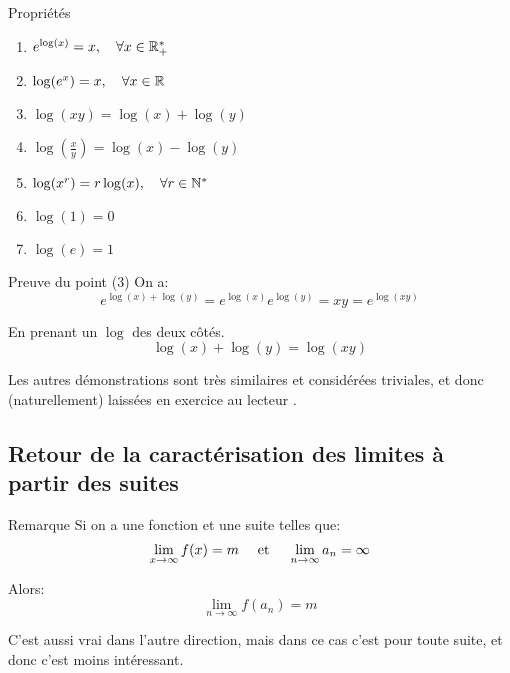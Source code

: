 \documentclass[a4paper]{article}
\begin{document}
\begin{parag}{Propriétés}
    \begin{enumerate}[left=0pt]
        \item $e^{\log\left(x\right)} = x, \mathspace \forall x \in \mathbb{R}^*_+$
        \item $\log\left(e^x\right) = x, \mathspace \forall x \in \mathbb{R}$ 
        \item $\log\left(xy\right) = \log\left(x\right) + \log\left(y\right)$
        \item $\log\left(\frac{x}{y}\right) = \log\left(x\right) - \log\left(y\right)$
        \item $\log\left(x^{r}\right) = r\log\left(x\right), \mathspace \forall r \in \mathbb{N}^*$
        \item $\log\left(1\right) = 0$
        \item $\log\left(e\right) = 1$
    \end{enumerate}
    
    \begin{subparag}{Preuve du point (3)}
        On a: 
        \[e^{\log\left(x\right) + \log\left(y\right)} = e^{\log\left(x\right)}e^{\log\left(y\right)} = xy = e^{\log\left(xy\right)}\]
        
        En prenant un $\log$ des deux côtés. 
        \[\log\left(x\right) + \log\left(y\right) = \log\left(xy\right)\]
    \end{subparag}

    Les autres démonstrations sont très similaires et considérées triviales, et donc (naturellement) laissées en exercice au lecteur \wink.
\end{parag}

\subsection[Caractérisation]{Retour de la caractérisation des limites à partir des suites}
\begin{parag}{Remarque}
    Si on a une fonction et une suite telles que: 
    \[\lim_{x \to \infty} f\left(x\right) = m \mathspace \text{ et } \mathspace \lim_{n \to \infty} a_n = \infty\]
    
    Alors: 
    \[\lim_{n \to \infty} f\left(a_n\right) = m\]

    C'est aussi vrai dans l'autre direction, mais dans ce cas c'est pour toute suite, et donc c'est moins intéressant.
\end{parag}
\end{document}
